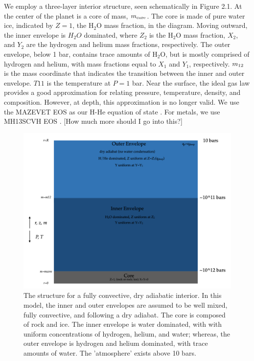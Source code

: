 \documentclass[11pt]{ucscthesisbs}
\begin{document}
We employ a three-layer interior structure, seen schematically in Figure 2.1. At the center of the planet is a core of mass, $m_{\rm core}$. The core is made of pure water ice, indicated by $Z = 1$, the H$_{2}$O mass fraction, in the diagram. Moving outward, the inner envelope is $H_{2}O$ dominated, where $Z_{2}$ is the H$_{2}$O mass fraction, $X_{2}$, and $Y_{2}$ are the hydrogen and helium mass fractions, respectively. The outer envelope, below 1 bar, contains trace amounts of H$_{2}$O, but is mostly comprised of hydrogen and helium, with mass fractions equal to $X_{1}$ and $Y_{1}$, respectively. $m_{\rm 12}$ is the mass coordinate that indicates the transition between the inner and outer envelope. $T1{1}$ is the temperature at $P=1$ bar. Near the surface, the ideal gas law provides a good approximation for relating pressure, temperature, density, and composition. However, at depth, this approximation is no longer valid. We use the MAZEVET EOS as our H-He equation of state \citep{mazevet_2019}. For metals, we use MH13SCVH EOS \citep{miguel_2018}. [How much more should I go into this?]

\begin{figure}[ht!]
 \centerline{
  \includegraphics[width=6.0in]{figures/structure_schematic_images/structure_schematic_images.001.png}
 }
\caption[A Standard Interior Structure Model]
{The structure for a fully convective, dry adiabatic interior. In this model, the inner and outer envelopes are assumed to be well mixed, fully convective, and following a dry adiabat. The core is composed of rock and ice. The inner envelope is water dominated, with with uniform concentrations of hydrogen, helium, and water; whereas, the outer envelope is hydrogen and helium dominated, with trace amounts of water. The 'atmosphere' exists above 10 bars.}
\label{fig:standard_dry_interior}
\end{figure}
\end{document}
